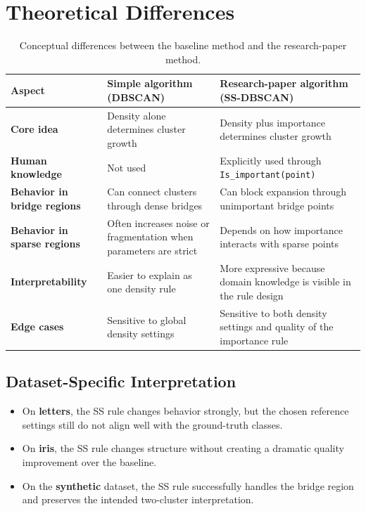 \documentclass[11pt,a4paper]{article}
\begin{document}
\section{Theoretical Differences}

\begin{table}[H]
\centering
\small
\begin{tabularx}{\textwidth}{>{\bfseries}lYY}
\toprule
Aspect & Simple algorithm (DBSCAN) & Research-paper algorithm (SS-DBSCAN) \\
\midrule
Core idea & Density alone determines cluster growth & Density plus importance determines cluster growth \\
Human knowledge & Not used & Explicitly used through \texttt{Is\_important(point)} \\
Behavior in bridge regions & Can connect clusters through dense bridges & Can block expansion through unimportant bridge points \\
Behavior in sparse regions & Often increases noise or fragmentation when parameters are strict & Depends on how importance interacts with sparse points \\
Interpretability & Easier to explain as one density rule & More expressive because domain knowledge is visible in the rule design \\
Edge cases & Sensitive to global density settings & Sensitive to both density settings and quality of the importance rule \\
\bottomrule
\end{tabularx}
\caption{Conceptual differences between the baseline method and the research-paper method.}
\end{table}

\subsection{Dataset-Specific Interpretation}

\begin{itemize}
\item On \textbf{letters}, the SS rule changes behavior strongly, but the chosen
reference settings still do not align well with the ground-truth classes.
\item On \textbf{iris}, the SS rule changes structure without creating a dramatic
quality improvement over the baseline.
\item On the \textbf{synthetic} dataset, the SS rule successfully handles the
bridge region and preserves the intended two-cluster interpretation.
\end{itemize}
\end{document}
